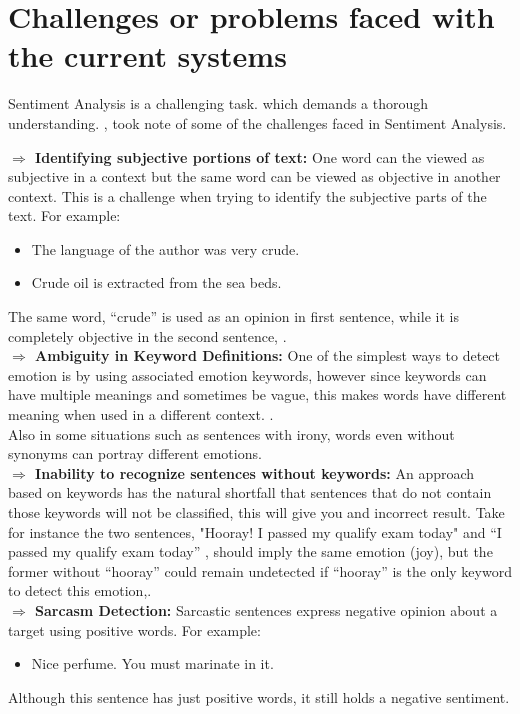 \section{Challenges or problems faced with the current systems}
Sentiment Analysis is a challenging task. which demands a thorough understanding.
\cite{ref39}, took note of some of the challenges faced in Sentiment Analysis.

\textbf{$\Rightarrow$ Identifying subjective portions of text:} One word can the viewed as subjective in a context but the same word can be viewed as objective in another context. This is a challenge when trying to identify the subjective parts of the text. For example:
\begin{itemize}
\item The language of the author was very crude.
\item Crude oil is extracted from the sea beds.
\end{itemize}

The same word, “crude” is used as an opinion in first sentence, while it is completely
objective in the second sentence, \cite{ref20}.\\
\textbf{$\Rightarrow$ Ambiguity in Keyword Definitions:} One of the simplest ways to detect emotion is by using associated emotion keywords, however since keywords can have multiple meanings and sometimes be vague, this makes words have different meaning when used in a  different context. \cite{ref39}.\\
Also in some situations such as sentences with irony, words even without synonyms can portray different emotions.\\
\textbf{$\Rightarrow$ Inability to recognize sentences without keywords:} 
An approach based on keywords has the natural shortfall that sentences that do not contain those keywords will not be classified, this will give you and incorrect result.
Take for instance the two sentences, "Hooray! I passed my qualify exam today"  and  “I passed my qualify exam today” , should imply the same emotion (joy), but the former without “hooray” could
remain undetected if “hooray” is the only keyword to detect this emotion,\cite{ref39}.\\


\textbf{$\Rightarrow$ Sarcasm Detection:} Sarcastic sentences express negative opinion about a target using
positive words. For example:\\
\begin{itemize}
\item Nice perfume. You must marinate in it.
\end{itemize}
Although this sentence has just positive words, it still holds a negative sentiment.\\


